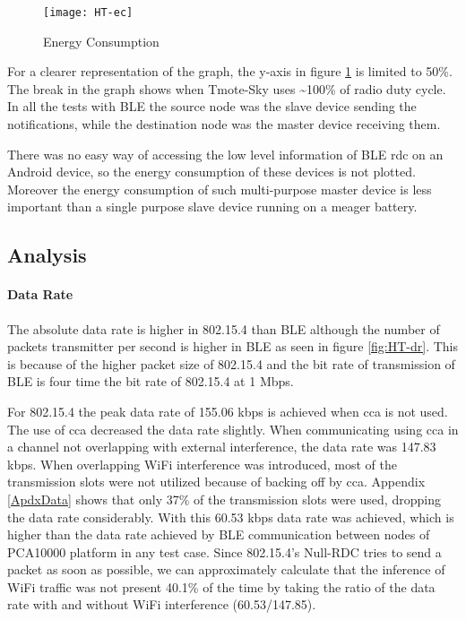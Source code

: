\begin{figure}[h]
\texttt{[image: HT-ec]}
\caption{Energy Consumption}
\label{fig:HT-ec}
\end{figure}

For a clearer representation of the graph, the y-axis in figure \ref{fig:HT-ec} is limited to 50\%. The break in the graph shows when Tmote-Sky uses \textasciitilde100\% of radio duty cycle. In all the tests with BLE the source node was the slave device sending the notifications, while the destination node was the master device receiving them.

There was no easy way of accessing the low level information of BLE \gls{rdc} on an Android device, so the energy consumption of these devices is not plotted. Moreover the energy consumption of such multi-purpose master device is less important than a single purpose slave device running on a meager battery.

\subsection{Analysis}
\paragraph{Data Rate}
The absolute data rate is higher in 802.15.4 than BLE although the number of packets transmitter per second is higher in BLE as seen in figure \ref{fig:HT-dr}. This is because of the higher packet size of 802.15.4 and the bit rate of transmission of BLE is four time the bit rate of 802.15.4 at 1 Mbps.

For 802.15.4 the peak data rate of 155.06 kbps is achieved when \gls{cca} is not used. The use of \gls{cca} decreased the data rate slightly. When communicating using \gls{cca} in a channel not overlapping with external interference, the data rate was 147.83 kbps. When overlapping WiFi interference was introduced, most of the transmission slots were not utilized because of backing off by \gls{cca}. Appendix \ref{ApdxData} shows that only 37\% of the transmission slots were used, dropping the data rate considerably. With this 60.53 kbps data rate was achieved, which is higher than the data rate achieved by BLE communication between nodes of PCA10000 platform in any test case. Since 802.15.4's Null-RDC tries to send a packet as soon as possible, we can approximately calculate that the inference of WiFi traffic was not present 40.1\% of the time by taking the ratio of the data rate with and without WiFi interference (60.53/147.85). 

